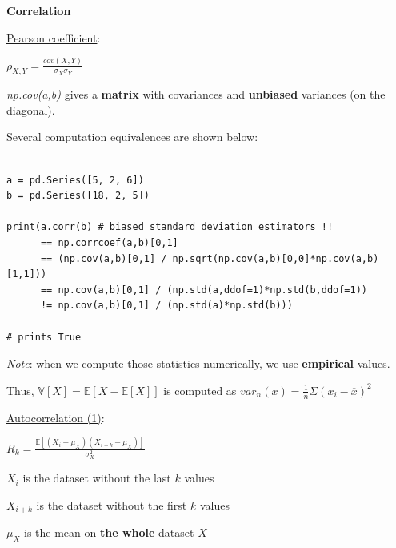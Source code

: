 {\fontsize{12pt}{22pt} \textbf{Correlation}\par}

\vspace{5mm}

\underline{Pearson coefficient}:

\begin{center}
$\rho_{X,Y} = \frac{cov(X,Y)}{\sigma_X \sigma_Y}$
\end{center}

\textit{np.cov(a,b)} gives a \textbf{matrix} with covariances and \textbf{unbiased} variances (on the diagonal). 

Several computation equivalences are shown below:

\lstset{language=Python}
\lstset{frame=lines}
\lstset{basicstyle=\footnotesize}
\begin{lstlisting}

a = pd.Series([5, 2, 6])
b = pd.Series([18, 2, 5])

print(a.corr(b) # biased standard deviation estimators !!
      == np.corrcoef(a,b)[0,1] 
      == (np.cov(a,b)[0,1] / np.sqrt(np.cov(a,b)[0,0]*np.cov(a,b)[1,1]))
      == np.cov(a,b)[0,1] / (np.std(a,ddof=1)*np.std(b,ddof=1)) 
      != np.cov(a,b)[0,1] / (np.std(a)*np.std(b)))

# prints True

\end{lstlisting}

\vspace{5mm}

\textit{Note}: when we compute those statistics numerically, we use \textbf{empirical} values.

Thus, $\mathbb{V}[X] = \mathbb{E}[X-\mathbb{E}[X]]$ is computed as $var_n(x)=\frac{1}{n}\Sigma(x_i - \overline{x})^2$

\vspace{5mm}

\underline{Autocorrelation (1)}:

\begin{center}
$R_{k} = \frac{\mathbb{E}[(X_i-\mu_X)(X_{i+k}-\mu_X)]}{\sigma_X^2}$
\end{center}

$X_i$ is the dataset without the last $k$ values

$X_{i+k}$ is the dataset without the first $k$ values

$\mu_X$ is the mean on \textbf{the whole} dataset $X$

